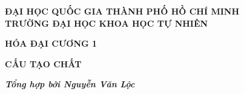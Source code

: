 \documentclass[12pt,a4paper]{book}
\begin{document}
\begin{titlepage}
\begin{center}
\textbf{ĐẠI HỌC QUỐC GIA THÀNH PHỐ HỒ CHÍ MINH}\\
\textbf{TRƯỜNG ĐẠI HỌC KHOA HỌC TỰ NHIÊN}
\end{center}
\vspace{4 cm}
\begin{center}
\fontsize{20}{16}\selectfont
\centerline{\textbf{HÓA ĐẠI CƯƠNG 1}}
\centerline{\textbf{CẤU TẠO CHẤT}}
\end{center}

\vspace{14 cm}
\centerline{\textbf{\textit{Tổng hợp bởi Nguyễn Văn Lộc}}}
\end{titlepage}
\tableofcontents
\newpage








\end{document}
